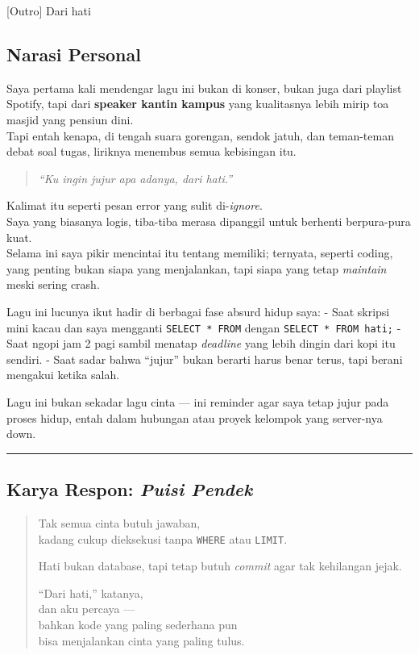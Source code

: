 \documentclass[
  letterpaper,
  DIV=11,
  numbers=noendperiod]{scrreprt}
\begin{document}
{[}Outro{]} Dari hati

\subsection{Narasi Personal}\label{narasi-personal}

Saya pertama kali mendengar lagu ini bukan di konser, bukan juga dari
playlist Spotify, tapi dari \textbf{speaker kantin kampus} yang
kualitasnya lebih mirip toa masjid yang pensiun dini.\\
Tapi entah kenapa, di tengah suara gorengan, sendok jatuh, dan
teman-teman debat soal tugas, liriknya menembus semua kebisingan itu.

\begin{quote}
\emph{``Ku ingin jujur apa adanya, dari hati.''}
\end{quote}

Kalimat itu seperti pesan error yang sulit di-\emph{ignore}.\\
Saya yang biasanya logis, tiba-tiba merasa dipanggil untuk berhenti
berpura-pura kuat.\\
Selama ini saya pikir mencintai itu tentang memiliki; ternyata, seperti
coding, yang penting bukan siapa yang menjalankan, tapi siapa yang tetap
\emph{maintain} meski sering crash.

Lagu ini lucunya ikut hadir di berbagai fase absurd hidup saya: - Saat
skripsi mini kacau dan saya mengganti \texttt{SELECT\ *\ FROM} dengan
\texttt{SELECT\ *\ FROM\ hati;} - Saat ngopi jam 2 pagi sambil menatap
\emph{deadline} yang lebih dingin dari kopi itu sendiri. - Saat sadar
bahwa ``jujur'' bukan berarti harus benar terus, tapi berani mengakui
ketika salah.

Lagu ini bukan sekadar lagu cinta --- ini reminder agar saya tetap jujur
pada proses hidup, entah dalam hubungan atau proyek kelompok yang
server-nya down.

\begin{center}\rule{0.5\linewidth}{0.5pt}\end{center}

\subsection{\texorpdfstring{Karya Respon: \emph{Puisi
Pendek}}{Karya Respon: Puisi Pendek}}\label{karya-respon-puisi-pendek}

\begin{quote}
Tak semua cinta butuh jawaban,\\
kadang cukup dieksekusi tanpa \texttt{WHERE} atau \texttt{LIMIT}.

Hati bukan database, tapi tetap butuh \emph{commit} agar tak kehilangan
jejak.

``Dari hati,'' katanya,\\
dan aku percaya ---\\
bahkan kode yang paling sederhana pun\\
bisa menjalankan cinta yang paling tulus.
\end{quote}
\end{document}
